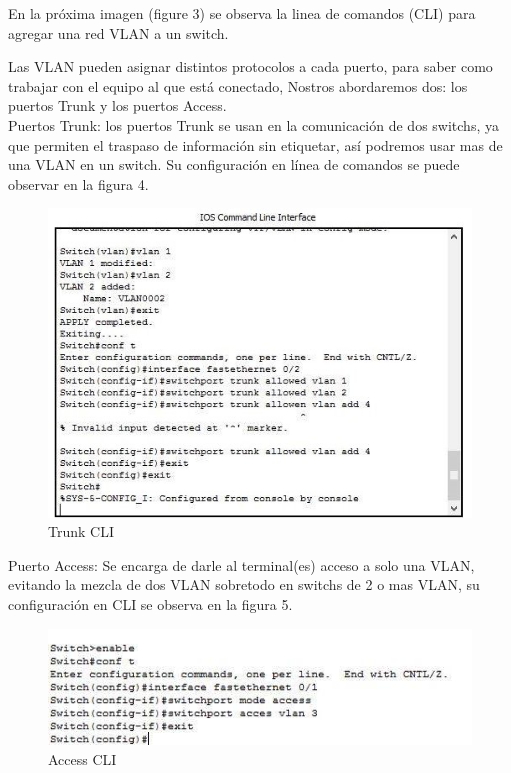 \documentclass{article}
\begin{document}
En la próxima imagen (figure 3) se observa la linea de comandos (CLI) para agregar una red VLAN a un switch.\\

\newpage

Las VLAN pueden asignar distintos protocolos a cada puerto, para saber como trabajar con el equipo al que está conectado, Nostros abordaremos dos: los puertos Trunk y los puertos Access.\\

Puertos Trunk: los puertos Trunk se usan en la comunicación de dos switchs, ya que permiten el traspaso de información sin etiquetar, así podremos usar mas de una VLAN en un switch. Su configuración en línea de comandos se puede observar en la figura 4.


\begin{figure}[h!]
\centering
\includegraphics[scale=0.8]{trunk}
\caption{Trunk CLI}
\end{figure}


Puerto Access: Se encarga de darle al terminal(es) acceso a solo una VLAN, evitando la mezcla de dos VLAN sobretodo en switchs de 2 o mas VLAN, su configuración en CLI se observa en la figura 5.




\begin{figure}[h!]
\centering
\includegraphics[scale=0.8]{access}
\caption{Access CLI}
\end{figure}
\end{document}
